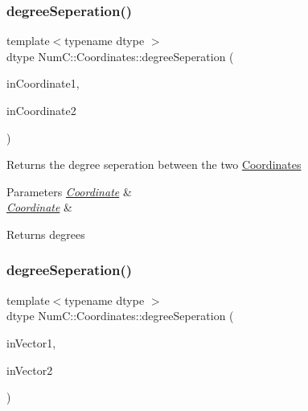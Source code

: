 \subsubsection{\texorpdfstring{degree\+Seperation()}{degreeSeperation()}\hspace{0.1cm}{\footnotesize\ttfamily [1/2]}}
{\footnotesize\ttfamily template$<$typename dtype $>$ \\
dtype Num\+C\+::\+Coordinates\+::degree\+Seperation (\begin{DoxyParamCaption}\item[{const \mbox{\hyperlink{class_num_c_1_1_coordinates_1_1_coordinate}{Coordinate}}$<$ dtype $>$ \&}]{in\+Coordinate1,  }\item[{const \mbox{\hyperlink{class_num_c_1_1_coordinates_1_1_coordinate}{Coordinate}}$<$ dtype $>$ \&}]{in\+Coordinate2 }\end{DoxyParamCaption})}

Returns the degree seperation between the two \mbox{\hyperlink{namespace_num_c_1_1_coordinates}{Coordinates}}


\begin{DoxyParams}{Parameters}
{\em \mbox{\hyperlink{class_num_c_1_1_coordinates_1_1_coordinate}{Coordinate}}} & \\
\hline
{\em \mbox{\hyperlink{class_num_c_1_1_coordinates_1_1_coordinate}{Coordinate}}} & \\
\hline
\end{DoxyParams}
\begin{DoxyReturn}{Returns}
degrees 
\end{DoxyReturn}
\mbox{\label{namespace_num_c_1_1_coordinates_afc8ea343df2b0b3060e41bc1ff4c28c7}} 
\subsubsection{\texorpdfstring{degree\+Seperation()}{degreeSeperation()}\hspace{0.1cm}{\footnotesize\ttfamily [2/2]}}
{\footnotesize\ttfamily template$<$typename dtype $>$ \\
dtype Num\+C\+::\+Coordinates\+::degree\+Seperation (\begin{DoxyParamCaption}\item[{const \mbox{\hyperlink{class_num_c_1_1_nd_array}{Nd\+Array}}$<$ dtype $>$ \&}]{in\+Vector1,  }\item[{const \mbox{\hyperlink{class_num_c_1_1_nd_array}{Nd\+Array}}$<$ dtype $>$ \&}]{in\+Vector2 }\end{DoxyParamCaption})}

